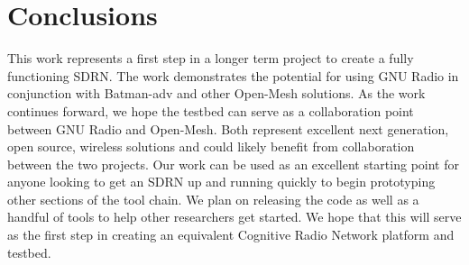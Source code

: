 \section{Conclusions}

This work represents a first step in a longer term project to create a fully functioning SDRN. The work demonstrates the potential for using GNU Radio in conjunction with Batman-adv and other Open-Mesh solutions. As the work continues forward, we hope the testbed can serve as a collaboration point between GNU Radio and Open-Mesh. Both represent excellent next generation, open source, wireless solutions and could likely benefit from collaboration between the two projects. Our work can be used as an excellent starting point for anyone looking to get an SDRN up and running quickly to begin prototyping other sections of the tool chain. We plan on releasing the code as well as a handful of tools to help other researchers get started. We hope that this will serve as the first step in creating an equivalent Cognitive Radio Network platform and testbed. 